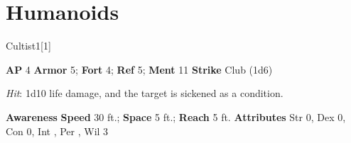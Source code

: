 \section{Humanoids}
\begin{monsection}{Cultist}{1}[1]
\vspace{-1em}\vspace{-1em}
\begin{spellcontent}
\begin{spelltargetinginfo}
{\textbf{AP} 4}
\pari \textbf{Armor} 5;
\textbf{Fort} 4;
\textbf{Ref} 5;
\textbf{Ment} 11
\pari \textbf{Strike} Club  (1d6)
\end{spelltargetinginfo}
\begin{spelleffects}
\pari
{}
\par
\par \textit{Hit}: 1d10 life damage, and the target is sickened as a condition.
\end{spelleffects}
\end{spellcontent}
\begin{spellsubcontent}
\begin{spellfooter}
\pari \textbf{Awareness} 
\pari \textbf{Speed} 30 ft.;
\textbf{Space} 5 ft.;
\textbf{Reach} 5 ft.
\pari \textbf{Attributes}
Str 0,
Dex 0,
Con 0,
Int ,
Per ,
Wil 3
\end{spellfooter}
\end{spellsubcontent}
\end{monsection}
